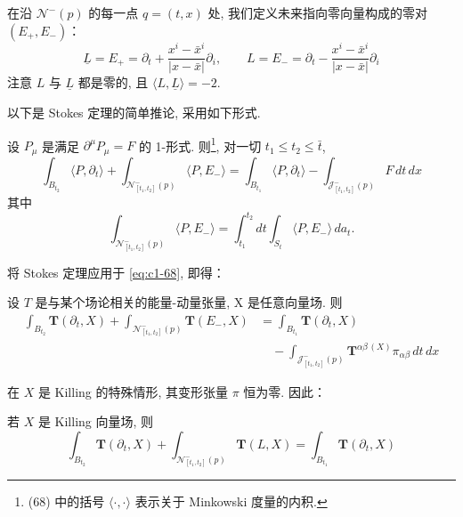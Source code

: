 在沿 $\mathcal{N}^-(p)$ 的每一点 $q = (t, x)$ 处, 我们定义未来指向零向量构成的零对 $(E_+, E_-)$：
\[
\underline{L} = E_+ = \partial_t + \frac{x^i - \bar{x}^i}{|x-\bar{x}|}\partial_i, \qquad L = E_- = \partial_t - \frac{x^i - \bar{x}^i}{|x-\bar{x}|}\partial_i
\]
注意 $L$ 与 $\underline{L}$ 都是零的, 且 $\langle L, \underline{L}\rangle = -2$. 

以下是 Stokes 定理的简单推论, 采用如下形式. 

\begin{proposition}\label{prop:c1-3.1}
设 $P_\mu$ 是满足 $\partial^\mu P_\mu = F$ 的 1-形式. 则\footnote{(68) 中的括号 $\langle\cdot, \cdot\rangle$ 表示关于 Minkowski 度量的内积. }, 对一切 $t_1 \leq t_2 \leq \bar{t}$, 
\begin{equation}
\int_{B_{t_2}}\langle P, \partial_t\rangle + \int_{\mathcal{N}^-_{[t_1, t_2]}(p)}\langle P, E_-\rangle = \int_{B_{t_1}}\langle P, \partial_t\rangle - \int_{\mathcal{J}^-_{[t_1, t_2]}(p)}F\, dt\, dx\label{eq:c1-68}
\end{equation}
其中
\[
\int_{\mathcal{N}^-_{[t_1, t_2]}(p)}\langle P, E_-\rangle = \int_{t_1}^{t_2}dt\int_{S_t}\langle P, E_-\rangle\, da_t.
\]
\end{proposition}

将 Stokes 定理应用于 \eqref{eq:c1-68}, 即得：

\begin{theorem}\label{thm:c1-3.2}
设 $T$ 是与某个场论相关的能量-动量张量, X 是任意向量场. 则
\begin{equation}
\begin{aligned}
\int_{B_{t_2}}\mathbf{T}(\partial_t, X) + \int_{\mathcal{N}^-_{[t_1, t_2]}(p)}\mathbf{T}(E_-, X) &= \int_{B_{t_1}}\mathbf{T}(\partial_t, X)\\
&\quad - \int_{\mathcal{J}^-_{[t_1, t_2]}(p)}\mathbf{T}^{\alpha\beta\, (X)}\pi_{\alpha\beta}\, dt\, dx
\end{aligned}\label{eq:c1-69}
\end{equation}
\end{theorem}

在 $X$ 是 Killing 的特殊情形, 其变形张量 $\pi$ 恒为零. 因此：

\begin{corollary}\label{cor:c1-3.3}
若 $X$ 是 Killing 向量场, 则
\begin{equation}
\int_{B_{t_2}}\mathbf{T}(\partial_t, X) + \int_{\mathcal{N}^-_{[t_1, t_2]}(p)}\mathbf{T}(L, X) = \int_{B_{t_1}}\mathbf{T}(\partial_t, X)\label{eq:c1-70}
\end{equation}
\end{corollary}


